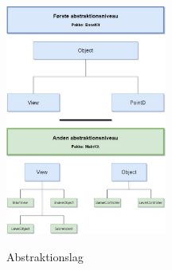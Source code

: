 \documentclass[]{article}
\begin{document}
	\begin{figure}[h!]
		\centering
		\includegraphics[width=200px]{Abstraktions_diagram.jpg}
		\label{fig:diagram}
		\caption{Abstraktionslag}
	\end{figure}
	
\end{document}
